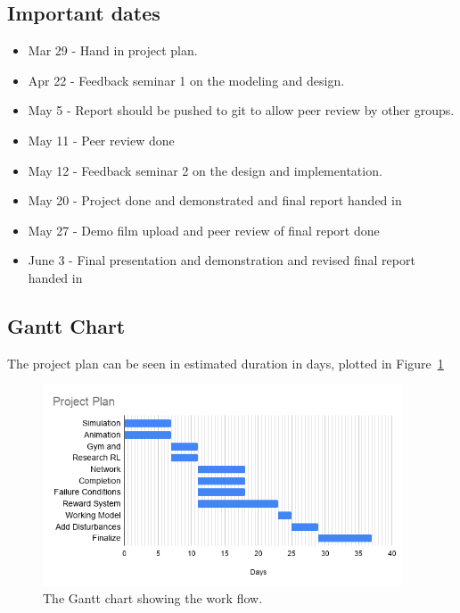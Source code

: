 \documentclass{article}
\begin{document}
\subsection{Important dates}
    \begin{itemize}
        \item Mar 29 -  Hand in project plan.
        \item Apr 22 - Feedback seminar 1 on the modeling and design.
        \item May 5 - Report should be pushed to git to allow peer review by other groups.
        \item May 11 - Peer review done
        \item May 12 - Feedback seminar 2 on the design and implementation.
        \item May 20 - Project done and demonstrated and final report handed in
        \item May 27 - Demo film upload and peer review of final report done
        \item June 3 - Final presentation and demonstration and revised final report handed in
    \end{itemize}
    
    \subsection{Gantt Chart}
    The project plan can be seen in estimated duration in days, plotted in Figure~\ref{fig:gantt}
    \begin{figure}
    		\centering
    		\includegraphics[width=0.95\textwidth]{figures/Project_plan.png}
    		\caption{The Gantt chart showing the work flow.} \label{fig:gantt}
    \end{figure}

\end{document}
